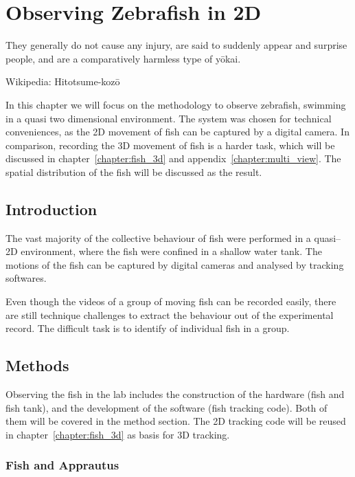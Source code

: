 \documentclass[11pt,twoside]{report}
\begin{document}
\chapter{Observing Zebrafish in 2D}
\label{chapter:fish_2d}



\epigraph{
They generally do not cause any injury, are said to suddenly appear and surprise people, and are a comparatively harmless type of yōkai.
}{Wikipedia: Hitotsume-kozō}


In this chapter we will focus on the methodology to observe zebrafish, swimming in a quasi two dimensional environment. The system was chosen for technical conveniences, as the 2D movement of fish can be captured by a digital camera. In comparison, recording the 3D movement of fish is a harder task, which will be discussed in chapter~\ref{chapter:fish_3d} and appendix~\ref{chapter:multi_view}. The spatial distribution of the fish will be discussed as the result.


\section{Introduction}


The vast majority of the collective behaviour of fish were performed in a quasi--2D environment, where the fish were confined in a shallow water tank. The motions of the fish can be captured by digital cameras and analysed by tracking softwares.



Even though the videos of a group of moving fish can be recorded easily, there are still technique challenges to extract the behaviour out of the experimental record. The difficult task is to identify of individual fish in a group.


\section{Methods}

Observing the fish in the lab includes the construction of the hardware (fish and fish tank), and the development of the software (fish tracking code). Both of them will be covered in the method section. The 2D tracking code will be reused in chapter~\ref{chapter:fish_3d} as basis for 3D tracking. 

\subsection{Fish and Apprautus}
\label{section:apprautus_2d}
\end{document}
